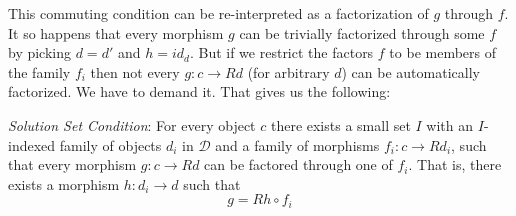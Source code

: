 \documentclass[11pt]{amsart}
\begin{document}
\begin{figure}[H]
\centering
\end{figure}

This commuting condition can be re-interpreted as a factorization of $g$ through $f$. It so happens that every morphism $g$ can be trivially factorized through some $f$ by  picking $d = d'$ and $h = id_d$. But if we restrict the factors $f$ to be members of the family $f_i$ then not every $g \colon c \to R d$  (for arbitrary $d$) can be automatically factorized. We have to demand it. That gives us the following:

\emph{Solution Set Condition}: For every object $c$ there exists a small set $I$ with an $I$-indexed family of objects $d_i$ in $\mathcal D$ and a family of morphisms $f_i \colon c \to R d_i$, such that every morphism $g \colon c \to R d$ can be factored through one of $f_i$. That is, there exists a morphism $h \colon d_i \to d$ such that
\[g = R h \circ f_i \]
\end{document}
